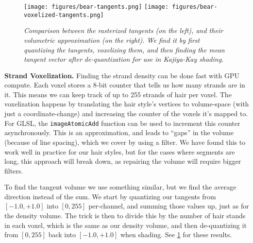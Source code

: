 \documentclass{egpubl}
\begin{document}
\begin{figure}[htb]
    \centering
    \texttt{[image: figures/bear-tangents.png]}
    \hfill
    \texttt{[image: figures/bear-voxelized-tangents.png]}
    \caption{\emph{Comparison between the rasterized tangents (on the left), and their volumetric approximation (on the right). We find it by first quantizing the tangents, voxelizing them, and then finding the mean tangent vector after de-quantization for use in Kajiya-Kay shading.}}
    \label{fig:tangents}
    \vspace{-2mm}
\end{figure}

\noindent \textbf{Strand Voxelization. } Finding the strand density can be done fast with GPU compute. Each voxel stores a 8-bit counter that tells us how many strands are in it. This means we can keep track of up to 255 strands of hair per voxel. The voxelization happens by translating the hair style's vertices to volume-space (with just a coordinate-change) and increasing the counter of the voxels it's mapped to. For GLSL, the \texttt{imageAtomicAdd} function can be used to increment this counter asynchronously. This is an approximation, and leads to ``gaps'' in the volume (because of line spacing), which we cover by using a filter. We have found this to work well in practice for our hair styles, but for the cases where segments are long, this approach will break down, as repairing the volume will require bigger filters.


To find the tangent volume we use something similar, but we find the average direction instead of the sum. We start by quantizing our tangents from $[-1.0,+1.0]$ into $[0,255]$ per-channel, and summing those values up, just as for the density volume. The trick is then to divide this by the number of hair stands in each voxel, which is the same as our density volume, and then de-quantizing it from $[0,255]$ back into $[-1.0,+1.0]$ when shading. See \cref{fig:tangents} for these results.
\end{document}
